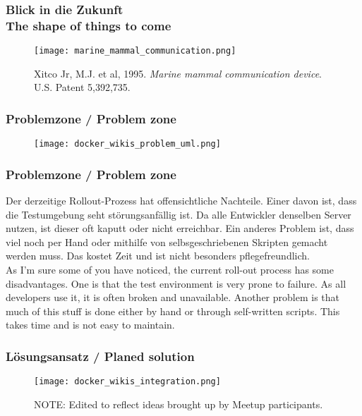 \begin{frame}
  \frametitle{Blick in die Zukunft \\ \textcolor{mfn_green}{The shape of things to come}}
  \begin{figure}
    \texttt{[image: marine\_mammal\_communication.png]}
    \caption{Xitco Jr, M.J. et al, 1995. \textit{Marine mammal communication device}. U.S. Patent 5,392,735.}
  \end{figure}
\end{frame}

\begin{frame}
  \frametitle{Problemzone / \textcolor{mfn_green}{Problem zone}}
  \begin{figure}
    \texttt{[image: docker\_wikis\_problem\_uml.png]}
  \end{figure}
\end{frame}

{\scriptsize
\begin{frame}
  \frametitle{Problemzone / \textcolor{mfn_green}{Problem zone}}
  Der derzeitige Rollout-Prozess hat offensichtliche Nachteile. Einer davon ist, dass die Testumgebung seht störungsanfällig ist. Da alle Entwickler denselben Server nutzen, ist dieser oft kaputt oder nicht erreichbar. Ein anderes Problem ist, dass viel noch per Hand oder mithilfe von selbsgeschriebenen Skripten gemacht werden muss. Das kostet Zeit und ist nicht besonders pflegefreundlich.\\
  \bigskip
  \textcolor{mfn_green}{As I'm sure some of you have noticed, the current roll-out process has some disadvantages. One is that the test environment is very prone to failure. As all developers use it, it is often broken and unavailable. Another problem is that much of this stuff is done either by hand or through self-written scripts. This takes time and is not easy to maintain.}
\end{frame}
}
\begin{frame}
  \frametitle{Lösungsansatz / \textcolor{mfn_green}{Planed solution}}
  \begin{figure}
    \texttt{[image: docker\_wikis\_integration.png]}
    \caption{\textcolor{mfn_blue}{NOTE: Edited to reflect ideas brought up by Meetup participants.}}
  \end{figure}
\end{frame}

